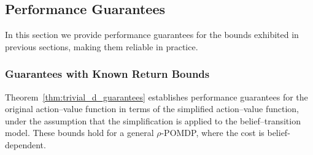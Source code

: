 \documentclass[acmlarge, manuscript, screen, review, natbib=false, oneside]{acmart}
\begin{document}
\subsection{Performance Guarantees}\label{sec:performance_guarantees}
In this section we provide performance guarantees for the bounds exhibited in previous sections, making them reliable in practice.

\subsubsection{Guarantees with Known Return Bounds}
Theorem~\ref{thm:trivial_d_guarantees} establishes performance guarantees for the original action--value function in terms of the simplified action--value function, under the assumption that the simplification is applied to the belief--transition model. These bounds hold for a general $\rho$-POMDP, where the cost is belief-dependent.
\end{document}

